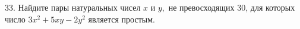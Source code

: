 33. Найдите пары натуральных чисел $x$ и $y,$ не превосходящих 30, для которых число $3x^2+5xy-2y^2$ является простым.\\
